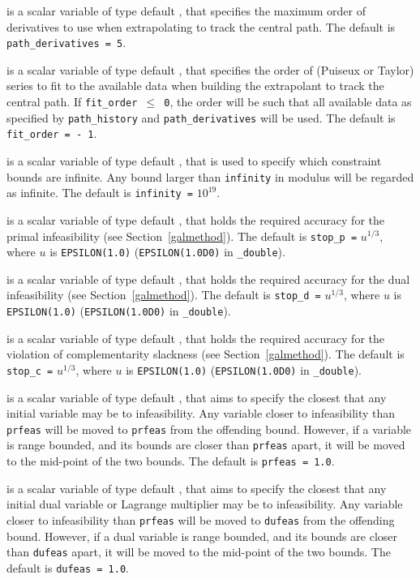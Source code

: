 \begin{description}
 is a scalar variable of type default \integer, that
specifies the maximum order of derivatives to use when extrapolating
to track the central path.
The default is {\tt path\_derivatives = 5}.

 is a scalar variable of type default \integer, that
specifies the order of (Puiseux or Taylor) series to fit to the available data
when building the extrapolant to track the central path. If {\tt fit\_order
$\leq$ 0}, the order will be such that all available data as specified by
{\tt path\_history} and {\tt path\_derivatives} will be used.
The default is {\tt fit\_order = - 1}.

 is a scalar variable of type default \realdp, that is used to
specify which constraint bounds are infinite.
Any bound larger than {\tt infinity} in modulus will be regarded as infinite.
The default is {\tt infinity =} $10^{19}$.

 is a scalar variable of type default \realdp, that holds the
required accuracy for the primal infeasibility (see Section~\ref{galmethod}).
The default is {\tt stop\_p =} $u^{1/3}$,
where $u$ is {\tt EPSILON(1.0)} ({\tt EPSILON(1.0D0)} in
{\tt \fullpackagename\_double}).

 is a scalar variable of type default
\realdp, that holds the
required accuracy for the dual infeasibility (see Section~\ref{galmethod}).
The default is {\tt stop\_d =} $u^{1/3}$,
where $u$ is {\tt EPSILON(1.0)} ({\tt EPSILON(1.0D0)} in
{\tt \fullpackagename\_double}).

 is a scalar variable of type default
\realdp, that holds the
required accuracy for the violation of complementarity slackness
(see Section~\ref{galmethod}).
The default is {\tt stop\_c =} $u^{1/3}$,
where $u$ is {\tt EPSILON(1.0)} ({\tt EPSILON(1.0D0)} in
{\tt \fullpackagename\_double}).

 is a scalar variable of type default \realdp, that aims to specify
the closest that any initial variable may be to infeasibility. Any variable
closer to infeasibility than {\tt prfeas} will be moved to {\tt prfeas} from
the offending bound. However, if a variable is range bounded, and its bounds
are closer than {\tt prfeas} apart, it will be moved to the mid-point of the
two bounds.
The default is {\tt prfeas = 1.0}.

 is a scalar variable of type default \realdp, that aims to specify
the closest that any initial dual variable or Lagrange multiplier may be to
infeasibility. Any variable closer to infeasibility than {\tt prfeas} will be
moved to {\tt dufeas} from the offending bound. However, if a dual variable
is range bounded, and its bounds are closer than {\tt dufeas} apart, it will
be moved to the mid-point of the two bounds.
The default is {\tt dufeas = 1.0}.


\end{description}
